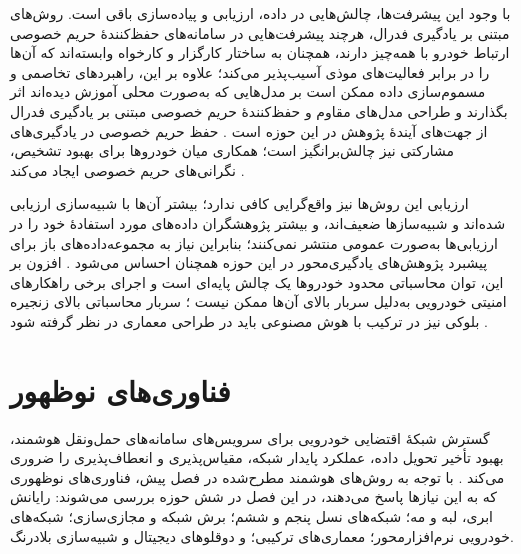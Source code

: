 \documentclass[12pt,a4paper]{article}
\begin{document}
با وجود این پیشرفت‌ها، چالش‌هایی در داده، ارزیابی و پیاده‌سازی باقی است. روش‌های مبتنی بر یادگیری فدرال، هرچند پیشرفت‌هایی در سامانه‌های حفظ‌کنندهٔ حریم خصوصی ارتباط خودرو با همه‌چیز دارند، همچنان به ساختار کارگزار و کارخواه وابسته‌اند که آن‌ها را در برابر فعالیت‌های موذی آسیب‌پذیر می‌کند؛ علاوه بر این، راهبرد‌های تخاصمی و مسموم‌سازی داده ممکن است بر مدل‌هایی که به‌صورت محلی آموزش دیده‌اند اثر بگذارند و طراحی مدل‌های مقاوم و حفظ‌کنندهٔ حریم خصوصی مبتنی بر یادگیری فدرال از جهت‌های آیندهٔ پژوهش در این حوزه است \cite{farsimadanReviewSecurityChallenges2025}. حفظ حریم خصوصی در یادگیری‌های مشارکتی نیز چالش‌برانگیز است؛ همکاری میان خودرو‌ها برای بهبود تشخیص، نگرانی‌های حریم خصوصی ایجاد می‌کند \cite{farsimadanReviewSecurityChallenges2025}.

ارزیابی این روش‌ها نیز واقع‌گرایی کافی ندارد؛ بیشتر آن‌ها با شبیه‌سازی ارزیابی شده‌اند و شبیه‌سازها ضعیف‌اند، و بیشتر پژوهشگران داده‌های مورد استفادهٔ خود را در ارزیابی‌ها به‌صورت عمومی منتشر نمی‌کنند؛ بنابراین نیاز به مجموعه‌داده‌های باز برای پیشبرد پژوهش‌های یادگیری‌محور در این حوزه همچنان احساس می‌شود \cite{farsimadanReviewSecurityChallenges2025}. افزون بر این، توان محاسباتی محدود خودرو‌ها یک چالش پایه‌ای است و اجرای برخی راهکار‌های امنیتی خودرویی به‌دلیل سربار بالای آن‌ها ممکن نیست \cite{farsimadanReviewSecurityChallenges2025}؛ سربار محاسباتی بالای زنجیره بلوکی نیز در ترکیب با هوش مصنوعی باید در طراحی معماری در نظر گرفته شود \cite{hozouriOverviewVANETVehicular2023}.

\section{فناوری‌های نوظهور}
گسترش شبکهٔ اقتضایی خودرویی برای سرویس‌های سامانه‌های حمل‌ونقل هوشمند، بهبود تأخیر تحویل داده، عملکرد پایدار شبکه، مقیاس‌پذیری و انعطاف‌پذیری را ضروری می‌کند \cite{hozouriOverviewVANETVehicular2023}. با توجه به روش‌های هوشمند مطرح‌شده در فصل پیش، فناوری‌های نوظهوری که به این نیاز‌ها پاسخ می‌دهند، در این فصل در شش حوزه بررسی می‌شوند: رایانش ابری، لبه و مه؛ شبکه‌های نسل پنجم و ششم؛ برش شبکه و مجازی‌سازی؛ شبکه‌های خودرویی نرم‌افزارمحور؛ معماری‌های ترکیبی؛ و دوقلو‌های دیجیتال و شبیه‌سازی بلادرنگ.
\end{document}
